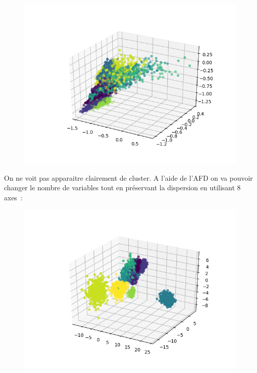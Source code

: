 \documentclass[12pt]{scrartcl} %
\begin{document}
\newline
\begin{figure}[!h]
 \centering 
\includegraphics[scale=.5]{init.png}
\end{figure}
\newline 

On ne voit pas apparaitre clairement de cluster. A l'aide de l'AFD on va pouvoir changer le nombre de variables tout en préservant la dispersion en utilisant 8 axes~:
\newline
\begin{figure}[!h]
 \centering 
\includegraphics[scale=.5]{AFD8.png}
\end{figure}
\newline 
\end{document}
